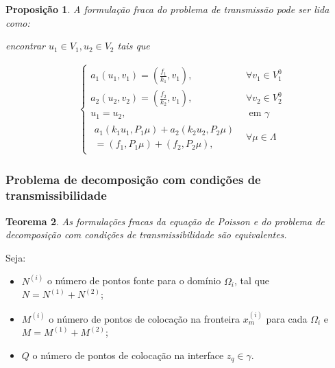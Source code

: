 \documentclass[portuguese,notheorems]{beamer}
\newtheorem{theorem}{Teorema}
\newtheorem{proposition}[theorem]{Proposição}
\begin{document}
\begin{frame}
    \begin{proposition}
    A formulação fraca do problema de transmissão pode ser lida como:
    \begin{center}
        \textit{encontrar} \(u_1\in V_1, u_2 \in V_2\) \textit{tais que}
    \end{center}
    \begin{equation*}\label{weak_decomp}
                \begin{aligned}
            &\begin{cases}
                a_1(u_1, v_1) = (\frac{f_1}{k_1}, v_1), & \forall v_1 \in V_1^0\\
                a_2(u_2, v_2) = (\frac{f_2}{k_2}, v_1), & \forall v_2 \in V_2^0\\
                u_1 = u_2, & \text{ em } \gamma\\
                \begin{aligned}
                a_1(k_1 u_1, P_1 \mu) + a_2(k_2 u_2, P_2 \mu) \\[0.2cm] = (f_1, P_1 \mu)
                + (f_2, P_2 \mu),
                \end{aligned} & \forall \mu \in \Lambda
            \end{cases}
        \end{aligned}
        \end{equation*}
\end{proposition}
\end{frame}

\begin{frame}
\frametitle{Problema de decomposição com condições de transmissibilidade}
    \begin{theorem}
        As formulações fracas da equação de Poisson e do problema de decomposição com condições de transmissibilidade são equivalentes.
    \end{theorem}
\end{frame}

\begin{frame}
    Seja:
    \begin{itemize}
      \item \(N^{(i)}\) o número de pontos fonte para o domínio \(\Omega_i\), tal que \(N=N^{(1)}+N^{(2)}\);
        \item  \(M^{(i)}\) o número de pontos de colocação na fronteira \(x^{(i)}_{m}\) para cada \(\Omega_i\) e \(M=M^{(1)}+M^{(2)}\);
        \item \(Q\) o número de pontos de colocação na interface \(z_q \in \gamma\).
    \end{itemize}
\end{frame}
\end{document}
